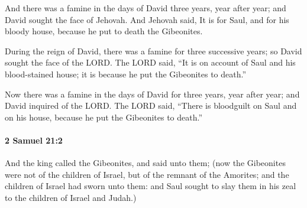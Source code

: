 			\begin{versebox}
					\item[BHS] 
					\item[ASV] And there was a famine in the days of David three years, year after year; and David sought the face of Jehovah. And Jehovah said, It is for Saul, and for his bloody house, because he put to death the Gibeonites.
					\item[NIV] During the reign of David, there was a famine for three successive years; so David sought the face of the LORD. The LORD said, “It is on account of Saul and his blood-stained house; it is because he put the Gibeonites to death.”
					\item[NRSV] Now there was a famine in the days of David for three years, year after year; and David inquired of the LORD. The LORD said, “There is bloodguilt on Saul and on his house, because he put the Gibeonites to death.”
			\end{versebox}

		\paragraph{2 Samuel 21:2} %
			\label{2SAMUEL-21-2}

			And the king called the Gibeonites, and said unto them; (now the Gibeonites were not of the children of Israel, but of the remnant of the Amorites; and the children of Israel had sworn unto them: and Saul sought to slay them in his zeal to the children of Israel and Judah.)

